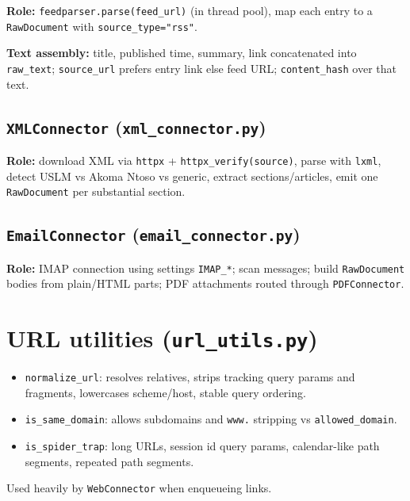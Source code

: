 \documentclass[11pt,a4paper]{article}
\begin{document}
\textbf{Role:} \texttt{feedparser.parse(feed\_url)} (in thread pool), map each entry to a \texttt{RawDocument} with \texttt{source\_type="rss"}.

\textbf{Text assembly:} title, published time, summary, link concatenated into \texttt{raw\_text}; \texttt{source\_url} prefers entry link else feed URL; \texttt{content\_hash} over that text.

\subsection{\texttt{XMLConnector} (\texttt{xml\_connector.py})}

\textbf{Role:} download XML via \texttt{httpx} + \texttt{httpx\_verify(source)}, parse with \texttt{lxml}, detect USLM vs Akoma Ntoso vs generic, extract sections/articles, emit one \texttt{RawDocument} per substantial section.

\subsection{\texttt{EmailConnector} (\texttt{email\_connector.py})}

\textbf{Role:} IMAP connection using settings \texttt{IMAP\_*}; scan messages; build \texttt{RawDocument} bodies from plain/HTML parts; PDF attachments routed through \texttt{PDFConnector}.

\section{URL utilities (\texttt{url\_utils.py})}

\begin{itemize}
  \item \texttt{normalize\_url}: resolves relatives, strips tracking query params and fragments, lowercases scheme/host, stable query ordering.
  \item \texttt{is\_same\_domain}: allows subdomains and \texttt{www.} stripping vs \texttt{allowed\_domain}.
  \item \texttt{is\_spider\_trap}: long URLs, session id query params, calendar-like path segments, repeated path segments.
\end{itemize}

Used heavily by \texttt{WebConnector} when enqueueing links.
\end{document}
